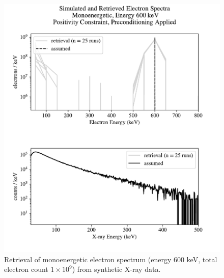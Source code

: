 \begin{figure}[p]
    \centering
    \includegraphics[width=\textwidth]{figures/chapter_4/synthetic_data_examples/mono_600keV_posonly_preconditioning_1e9_particles}
    \caption{Retrieval of monoenergetic electron spectrum (energy 600 keV, total electron count $1\times10^9$) from synthetic X-ray data.}
    \label{why_non_negative_is_good}
\end{figure}

